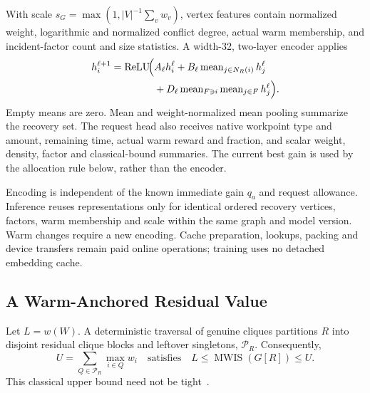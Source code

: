 With scale $s_G=\max(1,|V|^{-1}\sum_v w_v)$, vertex features contain
normalized weight, logarithmic and normalized conflict degree, actual warm
membership, and incident-factor count and size statistics. A width-32,
two-layer encoder applies
\begin{equation}
 \begin{aligned}
 h_i^{\ell+1}=\operatorname{ReLU}\!\Bigl(&A_\ell h_i^\ell+
 B_\ell\operatorname{mean}_{j\in N_R(i)}h_j^\ell\\
 &+D_\ell\operatorname{mean}_{F\ni i}\operatorname{mean}_{j\in F}h_j^\ell
 \Bigr).
 \end{aligned}
 \label{eq:residual-encoder}
\end{equation}
Empty means are zero. Mean and weight-normalized mean pooling summarize
the recovery set. The request head also receives native workpoint type and
amount, remaining time, actual warm reward and fraction, and scalar
weight, density, factor and classical-bound summaries. The current best
gain is used by the allocation rule below, rather than the encoder.

Encoding is independent of the known immediate gain $q_a$ and request
allowance. Inference reuses representations only for identical ordered
recovery vertices, factors, warm membership and scale within the same graph
and model version. Warm changes require a new encoding. Cache preparation,
lookups, packing and device transfers remain paid online operations;
training uses no detached embedding cache.

\subsection{A Warm-Anchored Residual Value}
Let $L=w(W)$. A deterministic traversal of genuine cliques partitions $R$
into disjoint residual clique blocks and leftover singletons,
$\mathcal P_R$. Consequently,
\begin{equation}
 U=\sum_{Q\in\mathcal P_R}\max_{i\in Q}w_i
 \quad\text{satisfies}\quad L\leq\operatorname{MWIS}(G[R])\leq U.
 \label{eq:residual-upper}
\end{equation}
This classical upper bound need not be tight~\cite{chvatal1975polytopes}.

